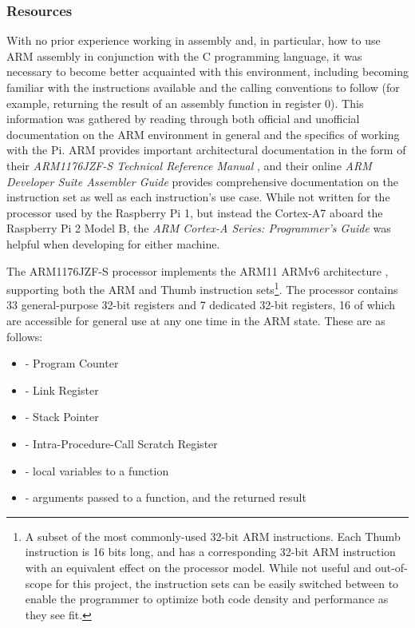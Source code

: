     \subsubsection{Resources}
       With no prior experience working in assembly and, in particular, how to
       use ARM assembly in conjunction with the C programming language, it was
       necessary to become better acquainted with this environment, including
       becoming familiar with the instructions available and the calling
       conventions to follow (for example, returning the result of an assembly
       function in register 0). This information was gathered by reading through
       both official and unofficial documentation on the ARM environment in
       general and the specifics of working with the Pi. ARM provides important
       architectural
       documentation in the form of their \textit{ARM1176JZF-S Technical
       Reference Manual} \cite{TRM}, and their online \textit{ARM Developer
       Suite Assembler Guide} \cite{OnlineARMGuide} provides comprehensive
       documentation on the instruction set as well as each instruction's use
       case. While not written for the processor used by the Raspberry Pi 1, but
       instead the Cortex-A7 aboard the Raspberry Pi 2 Model B, the \textit{ARM
       Cortex-A Series: Programmer's Guide} \cite{ProgrammersGuide} was helpful
       when developing for either machine.

       The ARM1176JZF-S processor implements the ARM11 ARMv6 architecture
       \cite{TRM}, supporting both the ARM and Thumb instruction sets\footnote{A
       subset of the most commonly-used 32-bit ARM instructions.  Each Thumb
       instruction is 16 bits long, and has a corresponding 32-bit ARM
       instruction with an equivalent effect on the processor model. While not
       useful and out-of-scope for this project, the instruction sets can be
       easily switched between to enable the programmer to optimize both code
       density and performance as they see fit.}. The processor contains 33
       general-purpose 32-bit registers and 7 dedicated 32-bit registers, 16 of
       which are accessible for general use at any one time in the ARM state.
       These are as follows:
       \begin{itemize}
           \itemsep0em
           \item {} - Program Counter
           \item {} - Link Register
           \item {} - Stack Pointer
           \item {} - Intra-Procedure-Call Scratch Register
           \item {} - local variables to a function
           \item {} - arguments passed to a function, and the returned
               result
       \end{itemize}

